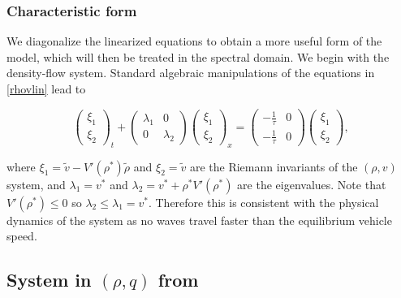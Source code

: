 \documentclass[a4paper, 10pt, conference]{ieeeconf}      %
\begin{document}
\subsubsection{Characteristic form}
We diagonalize the linearized equations to obtain a more useful form of the model, which will then be treated in the spectral domain. 
We begin with the density-flow system. Standard algebraic manipulations of the equations in \eqref{rhovlin} lead to

\begin{equation}
\begin{pmatrix}
	\xi_1 \\ 
	\xi_2
\end{pmatrix}_t
+ 
\begin{pmatrix}
	\lambda_1 & 0 
	\\
	0 & \lambda_2 
\end{pmatrix}
\begin{pmatrix}
	\xi_1 \\ 
	\xi_2
\end{pmatrix}_x
= 
\begin{pmatrix}
	-\frac{1}{\tau} & 0 \\
	-\frac{1}{\tau} & 0
\end{pmatrix}
\begin{pmatrix}
\xi_1 \\ \xi_2
\end{pmatrix},
\end{equation}

where $\xi_1 = \tilde{v} - V'( \rho^* )\tilde{\rho}$ and $\xi_2 = \tilde{v}$ are the Riemann invariants of the $(\rho, v)$ system, and $\lambda_1 = v^*$ and $\lambda_2 = v^* + \rho^* V'( \rho^*)$ are the eigenvalues. Note that $V'( \rho^*) \leq 0$ so $\lambda_2 \leq \lambda_1 = v^*$. Therefore this is consistent with the physical dynamics of the system as no waves travel faster than the equilibrium vehicle speed.


\subsection{System in $(\rho, q)$ from}
\end{document}
